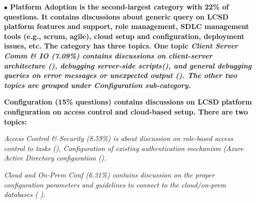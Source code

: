 



\nd\bf{$\bullet$ Platform  Adoption} is the second-largest category with 22\% of questions. It contains discussions about generic query on LCSD platform features
and support, role management, SDLC management tools (e.g., scrum, agile), cloud setup and configuration, deployment issues, etc. The category has three topics. One topic \it{Client Server Comm \& IO (7.09\%)} contains discussions on client-server architecture (), debugging server-side
scripts(), and general debugging queries on error messages or
unexpected output (). The other two topics are grouped under Configuration sub-category. 

\bf{{Configuration (15\% questions)}} contains discussions on LCSD platform configuration on access control and cloud-based setup. There are two topics:
\begin{inparaenum}[(1)] \item \it{Access Control \& Security (8.59\%)} is about
discussion on role-based access control to tasks (), Configuration of existing
authentication mechanism (Azure Active Directory configuration ().
\item \it{Cloud and On-Prem Conf (6.31\%)} contains discussion on the proper configuration parameters and 
guidelines to connect to the cloud/on-prem databases ( ).
\end{inparaenum} 



